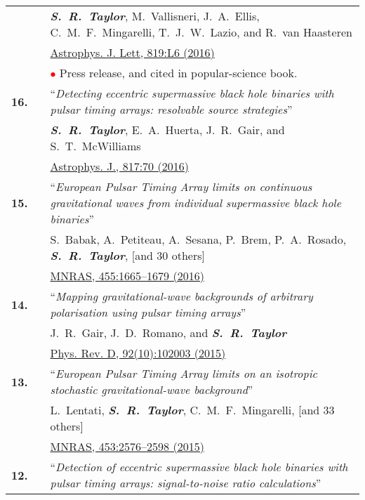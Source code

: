 \documentclass[11pt,letterpaper,sans]{moderncv}
\begin{document}
{\begin{longtable}{rp{0.3cm}p{15.8cm}}
&& \textit{\textbf{S.~R.~Taylor}}, M.~Vallisneri, J.~A.~Ellis, C.~M.~F.~Mingarelli, T.~J.~W.~Lazio, and R.~van Haasteren \\ 
&&  \href{http://iopscience.iop.org/article/10.3847/2041-8205/819/1/L6/meta}{{\color{color1} Astrophys. J. Lett, 819:L6 (2016)}} \\
&& \textcolor{red}{$\bullet$} Press release, and cited in popular-science book. \vspace{0.09cm}\\
\textbf{16.} & & ``\textit{Detecting eccentric supermassive black hole binaries with pulsar timing arrays: resolvable source strategies}'' \\ 
&& \textit{\textbf{S.~R.~Taylor}}, E.~A.~Huerta, J.~R.~Gair, and S.~T.~McWilliams \\ 
&& \href{http://iopscience.iop.org/article/10.3847/0004-637X/817/1/70/meta}{{\color{color1} Astrophys. J., 817:70 (2016)}} \vspace{0.09cm}\\
\textbf{15.} & & ``\textit{European Pulsar Timing Array limits on continuous gravitational waves from individual supermassive black hole binaries}'' \\ 
&& S.~Babak, A.~Petiteau, A.~Sesana, P.~Brem, P.~A.~Rosado, \textit{\textbf{S.~R.~Taylor}}, [and 30 others] \\ 
&& \href{http://mnras.oxfordjournals.org/content/455/2/1665}{{\color{color1} MNRAS, 455:1665--1679 (2016)}} \vspace{0.09cm}\\
\textbf{14.} & & ``\textit{Mapping gravitational-wave backgrounds of arbitrary polarisation using pulsar timing arrays}'' \\ 
&& J.~R.~Gair, J.~D.~Romano, and \textit{\textbf{S.~R.~Taylor}} \\ 
&& \href{http://journals.aps.org/prd/abstract/10.1103/PhysRevD.92.102003}{{\color{color1} Phys. Rev. D, 92(10):102003 (2015)}} \vspace{0.09cm}\\
\textbf{13.} & & ``\textit{European Pulsar Timing Array limits on an isotropic stochastic gravitational-wave background}'' \\ 
&& L.~Lentati, \textit{\textbf{S.~R.~Taylor}}, C.~M.~F.~Mingarelli, [and 33 others] \\ 
&& \href{http://mnras.oxfordjournals.org/content/453/3/2576}{{\color{color1} MNRAS, 453:2576--2598 (2015)}} \vspace{0.09cm}\\
\textbf{12.} & & ``\textit{Detection of eccentric supermassive black hole binaries with pulsar timing arrays: signal-to-noise ratio calculations}'' \\ 

\end{longtable}}
\end{document}
